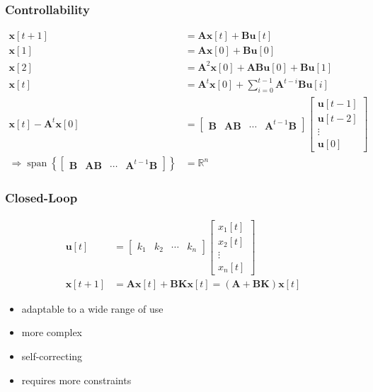\documentclass[aspectratio=169]{beamer}
\newcommand{\R}{\mathbb{R}}
\begin{document}
\begin{frame}
    \frametitle{Controllability}

    \begin{align}
        \bm{x}[t + 1] &= \bm{Ax}[t] + \bm{Bu}[t] \\
        \bm{x}[1] &= \bm{Ax}[0] + \bm{Bu}[0] \\
        \bm{x}[2] &= \bm{A}^2 \bm{x}[0] + \bm{ABu}[0] + \bm{Bu}[1] \\
        \bm{x}[t] &= \bm{A}^t \bm{x}[0] + \sum_{i = 0}^{t - 1} \bm{A}^{t - i} \bm{Bu}[i] \\
        \bm{x}[t] - \bm{A}^t \bm{x}[0] &=
        \begin{bmatrix}
            \bm{B} & \bm{AB} & \cdots & \bm{A}^{t - 1} \bm{B}
        \end{bmatrix}
        \begin{bmatrix}
            \bm{u}[t - 1] \\
            \bm{u}[t - 2] \\ 
            \vdots \\
            \bm{u}[0]
        \end{bmatrix} \\
        \Rightarrow \operatorname{span}\left\{
        \begin{bmatrix}
            \bm{B} & \bm{AB} & \cdots & \bm{A}^{t - 1} \bm{B}
        \end{bmatrix}\right\} &= \R^n
    \end{align}
\end{frame}

\begin{frame}
    \frametitle{Closed-Loop}

    \begin{align}
        \bm{u}[t] &=
        \begin{bmatrix}
            k_1 & k_2 & \cdots & k_n
        \end{bmatrix}
        \begin{bmatrix}
            x_1[t] \\
            x_2[t] \\
            \vdots \\
            x_n[t]
        \end{bmatrix} \\
        \bm{x}[t + 1] &= \bm{Ax}[t] + \bm{BKx}[t] = (\bm{A} + \bm{BK}) \bm{x}[t]
    \end{align}

    \begin{itemize}
        \item adaptable to a wide range of use
        \item more complex
        \item self-correcting
        \item requires more constraints
    \end{itemize}
\end{frame}
\end{document}
